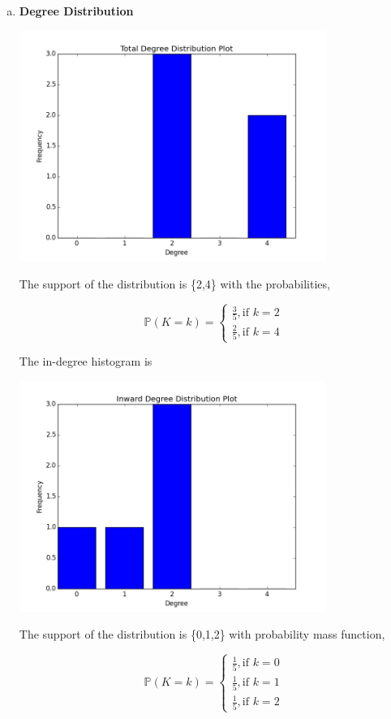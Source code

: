 \documentclass[a4paper]{article}
\begin{document}
\begin{enumerate}[(a)]
\item \textbf{Degree Distribution}

\begin{center}
\includegraphics[width=100mm]{degree_histogram.png}
\end{center}

The support of the distribution is \{2,4\} with the probabilities,

$$\mathbb{P}(K=k)=
\begin{cases}
\frac{3}{5}, \text{if }k=2\\
\frac{2}{5}, \text{if }k=4
\end{cases}
$$

The in-degree histogram is 

\begin{center}
\includegraphics[width=100mm]{in_degree_histogram.png}
\end{center}

The support of the distribution is \{0,1,2\} with probability mass function,

$$\mathbb{P}(K=k)=
\begin{cases}
\frac{1}{5}, \text{if }k=0\\
\frac{1}{5}, \text{if }k=1\\
\frac{1}{5}, \text{if }k=2
\end{cases}
$$


\end{enumerate}
\end{document}
